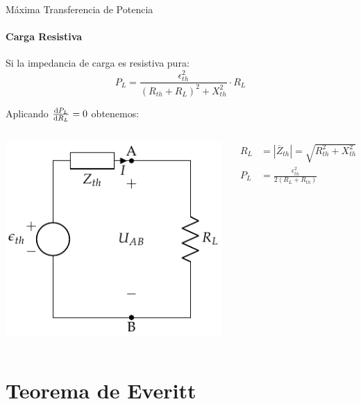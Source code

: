 \documentclass[aspectratio=169, usenames,svgnames,dvipsnames]{beamer}
\begin{document}
\begin{frame}[label={sec:org03eecb2}]{Máxima Transferencia de Potencia}
\framesubtitle{Carga Resistiva}

Si la impedancia de carga es resistiva pura:
\[
  P_L = \frac{\epsilon^2_{th}}{(R_{th} + R_L)^2 + X_{th}^2} \cdot R_L
\]

Aplicando \(\diff{P_L}{R_L} = 0\) obtenemos:

\begin{columns}
\begin{column}{0.5\columnwidth}
\begin{center}
\includegraphics[height=0.5\textheight]{../figs/EquivalenteThevenin0_RL.pdf}
\end{center}
\end{column}

\begin{column}{0.5\columnwidth}
\begin{align*}
      R_L &= |\overline{Z}_{th}| = \sqrt{R_{th}^2 + X_{th}^2}\\
      P_L &= \frac{\epsilon^2_{th}}{2(R_L + R_{th})}
\end{align*}
\end{column}
\end{columns}
\end{frame}


\section{Teorema de Everitt}
\label{sec:orge9cc5bb}
\end{document}
